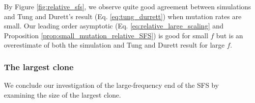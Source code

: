 \documentclass{article}
\numberwithin{equation}{section}
\begin{document}
By Figure \ref{fig:relative_sfs}, we observe quite good agreement between simulations and Tung and Durett's result (Eq. \ref{eq:tung_durrett}) when mutation rates are small. Our leading order asymptotic (Eq. \ref{eq:relative_large_scaling} and Proposition \ref{prop:small_mutation_relative_SFS}) is good for small $f$ but is an overestimate of both the simulation and Tung and Durett result for large $f$.

\subsubsection{The largest clone}\label{sec:smallmut_largeclone}

We conclude our investigation of the large-frequency end of the SFS by examining the size of the largest clone.
\end{document}
